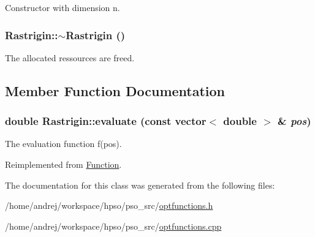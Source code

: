 Constructor with dimension n. 

\hypertarget{classRastrigin_2d87813baa436f94a5081994faf60662}{
\subsubsection{\setlength{\rightskip}{0pt plus 5cm}Rastrigin::$\sim$Rastrigin ()}}
\label{classRastrigin_2d87813baa436f94a5081994faf60662}


The allocated ressources are freed. 



\subsection{Member Function Documentation}
\hypertarget{classRastrigin_2b969cef4e9fe1a82e6550ab2cb74bd1}{
\subsubsection{\setlength{\rightskip}{0pt plus 5cm}double Rastrigin::evaluate (const vector$<$ double $>$ \& {\em pos})}}
\label{classRastrigin_2b969cef4e9fe1a82e6550ab2cb74bd1}


The evaluation function f(pos). 



Reimplemented from \hyperlink{classFunction_159260a1fc3afa8932491e4057b6b844}{Function}.

The documentation for this class was generated from the following files:\begin{CompactItemize}
\item 
/home/andrej/workspace/hpso/pso\_\-src/\hyperlink{optfunctions_8h}{optfunctions.h}\item 
/home/andrej/workspace/hpso/pso\_\-src/\hyperlink{optfunctions_8cpp}{optfunctions.cpp}\end{CompactItemize}
